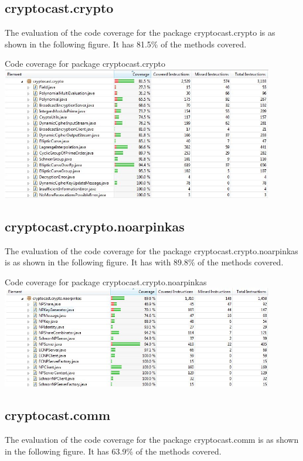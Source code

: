 \documentclass[a4paper,10pt]{scrartcl}
\begin{document}
\subsection{cryptocast.crypto}
The evaluation of the code coverage for the package cryptocast.crypto is as shown in the following figure.
It has 81.5\% of the methods covered.

\begin{illustration}{Code coverage for package cryptocast.crypto}
\includegraphics[width=450px]{figures/images/crypto.jpg}
\end{illustration}

\subsection{cryptocast.crypto.noarpinkas}
The evaluation of the code coverage for the package cryptocast.crypto.noarpinkas is as shown in the following figure.
It has with 89.8\% of the methods covered.

\begin{illustration}{Code coverage for package cryptocast.crypto.noarpinkas}
\includegraphics[width=450px]{figures/images/noarpinkas.jpg}
\end{illustration}

\subsection{cryptocast.comm}
The evaluation of the code coverage for the package cryptocast.comm is as shown in the following figure.
It has 63.9\% of the methods covered.
\end{document}

